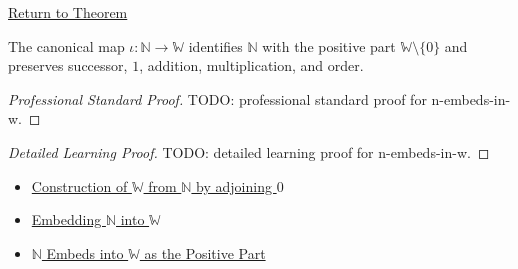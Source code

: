 \newpage
{}
\label{prf:n-embeds-in-w}

\begin{remark*}[Return]
\hyperref[thm:n-embeds-in-w]{Return to Theorem}
\end{remark*}

\begin{theorem*}[$N$ Embeds in $W$]
The canonical map $\iota:\mathbb{N}\to \mathbb{W}$ identifies
$\mathbb{N}$ with the positive part $\mathbb{W}\setminus\{0\}$ and preserves
successor, $1$, addition, multiplication, and order.
\end{theorem*}

\begin{proof}[Professional Standard Proof]
\LRAProofBodyStart
TODO: professional standard proof for n-embeds-in-w.
\end{proof}

\begin{proof}[Detailed Learning Proof]
\LRAProofBodyStart
TODO: detailed learning proof for n-embeds-in-w.
\end{proof}

\begin{remark*}
\end{remark*}

\begin{dependencies}
\begin{itemize}
  \item \hyperref[def:whole-numbers]{Construction of $\mathbb{W}$ from $\mathbb{N}$ by adjoining $0$}
  \item \hyperref[def:embedding-n-into-w]{Embedding $\mathbb{N}$ into $\mathbb{W}$}
  \item \hyperref[thm:n-embeds-into-w-as-positive-part]{$\mathbb{N}$ Embeds into $\mathbb{W}$ as the Positive Part}
\end{itemize}
\end{dependencies}

\clearpage
